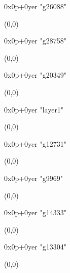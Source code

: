    0x0p+0yer "g26088"
  \begin{textblock}{1}(0,0)
  \end{textblock}

   0x0p+0yer "g28758"
  \begin{textblock}{1}(0,0)
  \end{textblock}

   0x0p+0yer "g20349"
  \begin{textblock}{1}(0,0)
  \end{textblock}

   0x0p+0yer "layer1"
  \begin{textblock}{1}(0,0)
  \end{textblock}

   0x0p+0yer "g12731"
  \begin{textblock}{1}(0,0)
  \end{textblock}

   0x0p+0yer "g9969"
  \begin{textblock}{1}(0,0)
  \end{textblock}

   0x0p+0yer "g14333"
  \begin{textblock}{1}(0,0)
  \end{textblock}

   0x0p+0yer "g13304"
  \begin{textblock}{1}(0,0)
  \end{textblock}
